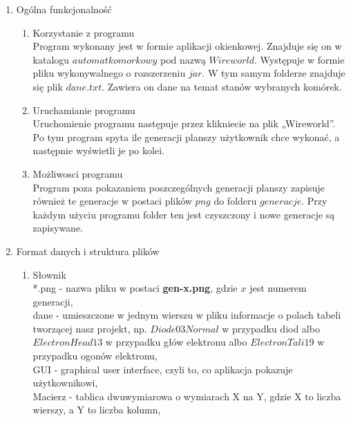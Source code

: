 \documentclass[11pt]{article}
\begin{document}
\begin{enumerate}
 
 
\item Ogólna funkcjonalność

\begin{enumerate}[label=\arabic{enumi}.\arabic*.]
 \item  Korzystanie z programu
 \\Program wykonany jest w formie aplikacji okienkowej. Znajduje się on w katalogu $automat komorkowy$ pod nazwą $Wireworld$. Występuje w formie pliku wykonywalnego o rozszerzeniu $jar.$ W tym samym folderze znajduje się plik $dane.txt$. Zawiera on dane na temat stanów wybranych komórek.\\
\item  Uruchamianie programu
\\Uruchomienie programu następuje przez klikniecie na plik „Wireworld”. Po tym program spyta ile generacji planszy użytkownik chce wykonać, a następnie wyświetli je po kolei.\\
\item Możliwosci programu
\\Program poza pokazaniem poszczególnych generacji planszy zapisuje również te generacje w postaci plików $png$ do folderu $generacje$. Przy każdym użyciu programu folder ten jest czyszczony i nowe generacje są zapisywane.\\
\end{enumerate}
 
  \item Format danych i struktura plików
  
  \begin{enumerate}[label=\arabic{enumi}.\arabic*.]
  
 \item Słownik\\
 *.png - nazwa pliku w postaci \textbf{gen-x.png}, gdzie $x$ jest numerem generacji,\\
 
 dane - umieszczone w jednym wierszu w pliku informacje o polach tabeli tworzącej nasz projekt, np. $Diode 0 3 Normal$ w przypadku diod albo $ElectronHead 1 3$ w przypadku głów elektronu albo $ElectronTali 1 9$ w przypadku ogonów elektronu,\\
 
 GUI - graphical user interface, czyli to, co aplikacja pokazuje użytkownikowi,\\
 
 Macierz - tablica dwuwymiarowa o wymiarach X na Y, gdzie X to liczba wierszy, a Y to liczba kolumn,\\
 

\end{enumerate}
\end{enumerate}
\end{document}

